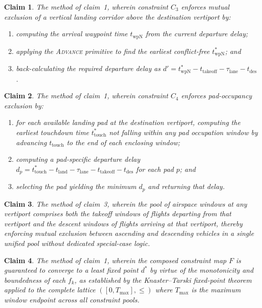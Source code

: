 \documentclass[12pt,a4paper]{article}
\newtheorem{claim}{Claim}
\newcommand{\twpN}{t_{\mathrm{wpN}}}
\newcommand{\ttouch}{t_{\mathrm{touch}}}
\newcommand{\tto}{t_{\mathrm{takeoff}}}
\newcommand{\tland}{t_{\mathrm{land}}}
\newcommand{\lane}{\tau_{\mathrm{lane}}}
\begin{document}
\begin{claim}
The method of claim~1, wherein constraint $C_3$ enforces mutual exclusion of a
vertical landing corridor above the destination vertiport by:
\begin{enumerate}[label=\alph*)]
  \item computing the arrival waypoint time $\twpN$ from the current departure
    delay;
  \item applying the \textsc{Advance} primitive to find the earliest conflict-free
    $\twpN^*$; and
  \item back-calculating the required departure delay as
    $d' = \twpN^* - \tto - \lane - t_{\mathrm{des}}$.
\end{enumerate}
\end{claim}

\begin{claim}
The method of claim~1, wherein constraint $C_4$ enforces pad-occupancy
exclusion by:
\begin{enumerate}[label=\alph*)]
  \item for each available landing pad at the destination vertiport, computing
    the earliest touchdown time $\ttouch^*$ not falling within any pad
    occupation window by advancing $\ttouch$ to the end of each enclosing
    window;
  \item computing a pad-specific departure delay
    $d_p = \ttouch^* - \tland - \lane - \tto - t_{\mathrm{des}}$ for each
    pad $p$; and
  \item selecting the pad yielding the minimum $d_p$ and returning that delay.
\end{enumerate}
\end{claim}

\begin{claim}
The method of claim~3, wherein the pool of airspace windows at any vertiport
comprises both the takeoff windows of flights departing from that vertiport and
the descent windows of flights arriving at that vertiport, thereby enforcing
mutual exclusion between ascending and descending vehicles in a single unified
pool without dedicated special-case logic.
\end{claim}

\begin{claim}
The method of claim~1, wherein the composed constraint map $F$ is guaranteed to
converge to a least fixed point $d^*$ by virtue of the monotonicity and
boundedness of each $f_k$, as established by the Knaster--Tarski fixed-point
theorem applied to the complete lattice $([0, T_{\max}], \le)$ where $T_{\max}$
is the maximum window endpoint across all constraint pools.
\end{claim}
\end{document}
